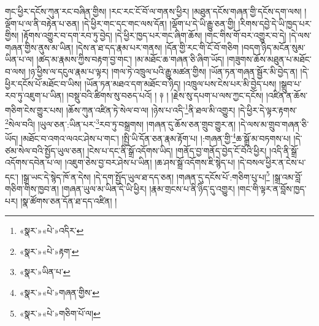 གང་ཕྱིར་དངོས་ཀུན་རང་བཞིན་གྱིས། །རང་རང་ངོ་བོ་ལ་གནས་ཕྱིར། །མཐུན་དངོས་གཞན་གྱི་དངོས་དག་ལས། །ལྡོག་པ་ལ་ནི་བརྟེན་པ་ཅན། །དེ་ཕྱིར་གང་དང་གང་ལས་དོན། །ལྡོག་པ་དེ་ཡི་རྒྱུ་ཅན་གྱི། །རིགས་དབྱེ་དེ་ཡི་ཁྱད་པར་གྱིས། །རྟོགས་འགྱུར་བ་དག་རབ་ཏུ་བྱེད། །དེ་ཕྱིར་ཁྱད་པར་གང་ཞིག་ཆོས། །གང་གིས་གོ་བར་འགྱུར་བ་དེ། །དེ་ལས་གཞན་གྱིས་ནུས་མ་ཡིན། །དེས་ན་ཐ་དད་རྣམ་པར་གནས། །དོན་གྱི་རང་གི་ངོ་བོ་གཅིག །བདག་ཉིད་མངོན་སུམ་ཡིན་པ་ལ། །ཚད་མ་རྣམས་ཀྱིས་བརྟག་བྱ་གང་། །མ་མཐོང་ཆ་གཞན་ཅི་ཞིག་ཡོད། །གཟུགས་ཆོས་མཐུན་པ་མཐོང་བ་ལས། །ཉ་ཕྱིས་ལ་དངུལ་རྣམ་པ་ལྟར། །གལ་ཏེ་འཁྲུལ་པའི་རྒྱུ་མཚན་གྱིས། །ཡོན་ཏན་གཞན་སྦྱོར་མི་བྱེད་ན། །དེ་ཕྱིར་དངོས་པོ་མཐོང་བ་ཡིས། །ཡོན་ཏན་མཐའ་དག་མཐོང་བ་ཉིད། །འཁྲུལ་པས་ངེས་པར་མི་བྱེད་པས། །སྒྲུབ་པ་རབ་ཏུ་འཇུག་པ་ཡིན། །བསྡུ་བའི་ཚིགས་སུ་བཅད་པའོ། ། ༈ ། །རྗེས་སུ་དཔག་པ་ལས་ཀྱང་དངོས། །འཛིན་ན་ཆོས་གཅིག་ངེས་གྱུར་པས། །ཆོས་ཀུན་འཛིན་ཏེ་སེལ་བ་ལ། །ཉེས་པ་འདི་\footnote{«སྣར་»«པེ་»འདིར་}ནི་ཐལ་མི་འགྱུར། །དེ་ཕྱིར་དེ་ལྟར་རྟགས་\footnote{«སྣར་»«པེ་»རྟག་}སེལ་བའི། །ཡུལ་ཅན་:ཡིན་པར་\footnote{«སྣར་»ཡིན་པ་}རབ་ཏུ་བསྒྲགས། །གཞན་དུ་ཆོས་ཅན་གྲུབ་གྱུར་ན། །དེ་ལས་མ་གྲུབ་གཞན་ཅི་ཡོད། །མཐོང་བ་འགའ་ལའང་ཤེས་པ་གང་། །སྤྱི་ཡི་དོན་ཅན་རྣམ་རྟོག་པ། །:གཞན་གྱི་\footnote{«སྣར་»«པེ་»གཞན་གྱིས་}ཆ་སྒྲོ་མ་བཏགས་པ། །དེ་ཙམ་སེལ་བའི་སྤྱོད་ཡུལ་ཅན། །ངེས་པ་དང་ནི་སྒྲོ་འདོགས་ཡིད། །གནོད་བྱ་གནོད་བྱེད་ངོ་བོའི་ཕྱིར། །འདི་ནི་སྒྲོ་འདོགས་དབེན་པ་ལ། །འཇུག་ཅེས་བྱ་བར་ཤེས་པ་ཡིན། །ཆ་ཤས་སྒྲོ་འདོགས་ཇི་སྙེད་པ། །དེ་བསལ་ཕྱིར་ན་ངེས་པ་དང་། །སྒྲ་ཡང་དེ་སྙེད་ཁོ་ན་དེས། །དེ་དག་སྤྱོད་ཡུལ་ཐ་དད་ཅན། །གཞན་དུ་དངོས་པོ་:གཅིག་པུ་པ།\footnote{«སྣར་»«པེ་»གཅིག་པོ་ལ།} །སྒྲ་འམ་བློ་གཅིག་གིས་ཁྱབ་ན། །གཞན་ཡུལ་མ་ཡིན་དེ་ཡི་ཕྱིར། །རྣམ་གྲངས་པ་ནི་ཉིད་དུ་འགྱུར། །གང་གི་ལྟར་ན་བློས་ཁྱད་པར། །སྣ་ཚོགས་ཅན་དོན་ཐ་དད་འཛིན། །
